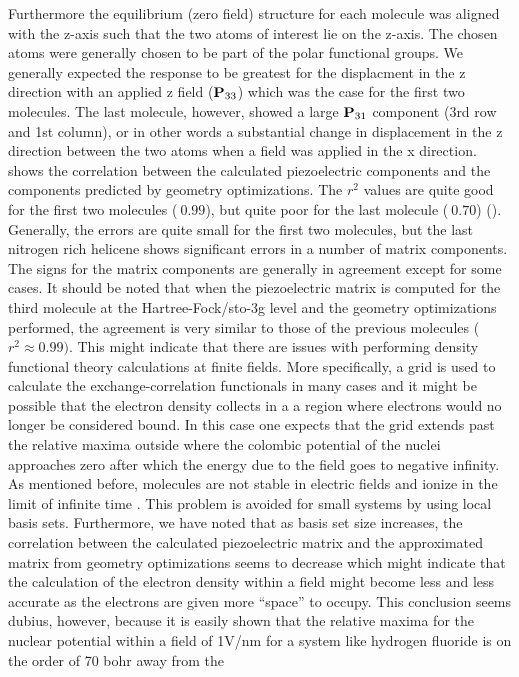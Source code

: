 Furthermore the equilibrium (zero field) structure for each molecule was 
aligned with the z-axis such that the two atoms of interest lie on the z-axis.  
The chosen atoms were generally chosen to be part of the polar functional groups.  
We generally expected the response to be greatest for the displacment in the 
z direction with an applied z field (${\bf{P}}_{33}$) which was the case for the first two molecules. 
The last molecule, however, showed a large ${\bf{P}}_{31}$ component (3rd row and 1st column),
or in other words a substantial change in displacement in the z direction between the two atoms when a field was applied in the x direction.  
 shows the correlation between the calculated piezoelectric components and the components predicted by geometry optimizations.
The $r^2$ values are quite good for the first two molecules ($~0.99$), but quite poor for the last molecule ($~0.70$) ().
Generally, the errors are quite small for the first two molecules, but the last nitrogen rich helicene shows significant errors in a number of matrix components.
The signs for the matrix components are generally in agreement except for some cases.  
It should be noted that when the piezoelectric matrix is computed for the third molecule at the Hartree-Fock/sto-3g \cite{fock, hehre, collins} level and the geometry optimizations performed, the 
agreement is very similar to those of the previous molecules ($r^2\approx 0.99)$.  
This might indicate that there are issues with performing density functional theory calculations at finite fields.
More specifically, a grid is used to calculate the exchange-correlation functionals in many cases and it might be possible that the electron density collects in a a region where electrons would no longer be considered bound.
In this case one expects that the grid extends past the relative maxima outside where the colombic potential of the nuclei approaches zero after which the energy due to the field goes to negative infinity.  
As mentioned before, molecules are not stable in electric fields and ionize in the limit of infinite time \cite{Yamabe1977}.
This problem is avoided for small systems by using local basis sets.  
Furthermore, we have noted that as basis set size increases, the correlation between the calculated piezoelectric matrix and the approximated matrix from geometry optimizations seems to 
decrease which might indicate that the calculation of the electron density within a field might become less and less accurate as the electrons are given more ``space'' to occupy. 
This conclusion seems dubius, however, because it is easily shown that the relative maxima for the nuclear potential within a field of 1V/nm for a system like hydrogen fluoride is on the order of 70 bohr away from the 
